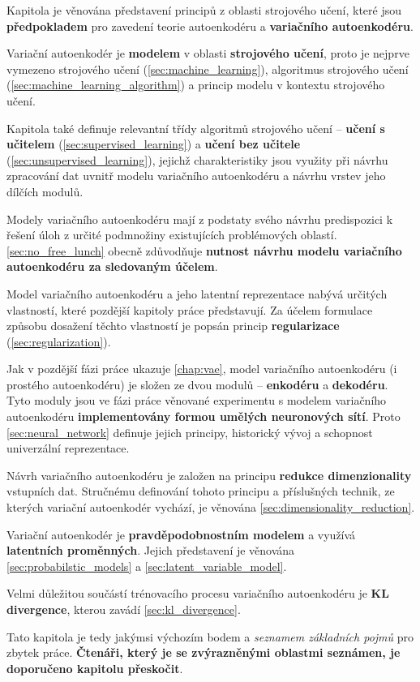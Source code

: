 Kapitola je věnována představení principů z oblasti strojového učení,
které jsou \textbf{předpokladem} pro zavedení teorie autoenkodéru a \textbf{variačního autoenkodéru}.

Variační autoenkodér je \textbf{modelem} v oblasti \textbf{strojového učení}, proto je nejprve vymezeno strojového učení (\autoref{sec:machine_learning}), algoritmus strojového učení (\autoref{sec:machine_learning_algorithm}) a princip modelu v kontextu strojového učení.

Kapitola také definuje relevantní třídy algoritmů strojového učení – \textbf{učení s učitelem} (\autoref{sec:supervised_learning}) a \textbf{učení bez učitele} (\autoref{sec:unsupervised_learning}), jejichž charakteristiky jsou využity při návrhu zpracování dat uvnitř modelu variačního autoenkodéru a návrhu vrstev jeho dílčích modulů.

Modely variačního autoenkodéru mají z podstaty svého návrhu predispozici k řešení úloh z určité podmnožiny existujících problémových oblastí.
\autoref{sec:no_free_lunch} obecně zdůvodňuje \textbf{nutnost návrhu modelu variačního autoenkodéru za sledovaným účelem}.

Model variačního autoenkodéru a jeho latentní reprezentace nabývá určitých vlastností, které pozdější kapitoly práce představují.
Za účelem formulace způsobu dosažení těchto vlastností je popsán princip \textbf{regularizace} (\autoref{sec:regularization}).

Jak v pozdější fázi práce ukazuje \autoref{chap:vae}, model variačního autoenkodéru (i prostého autoenkodéru) je složen ze dvou modulů – \textbf{enkodéru} a \textbf{dekodéru}.
Tyto moduly jsou ve fázi práce věnované experimentu s modelem variačního autoenkodéru \textbf{implementovány formou umělých neuronových sítí}. Proto \autoref{sec:neural_network} definuje jejich principy, historický vývoj a schopnost univerzální reprezentace.

Návrh variačního autoenkodéru je založen na principu \textbf{redukce dimenzionality} vstupních dat.
Stručnému definování tohoto principu a příslušných technik, ze kterých variační autoenkodér vychází, je věnována \autoref{sec:dimensionality_reduction}.

Variační autoenkodér je \textbf{pravděpodobnostním modelem} a využívá \textbf{latentních proměnných}.
Jejich představení je věnována \autoref{sec:probabilstic_models} a \autoref{sec:latent_variable_model}.

Velmi důležitou součástí trénovacího procesu variačního autoenkodéru je \textbf{KL divergence}, kterou zavádí \autoref{sec:kl_divergence}.

Tato kapitola je tedy jakýmsi výchozím bodem a \emph{seznamem základních pojmů} pro zbytek práce.
\textbf{Čtenáři, který je se zvýrazněnými oblastmi seznámen, je doporučeno kapitolu přeskočit}.